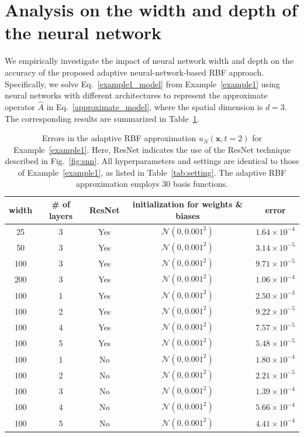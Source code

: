 \section{Analysis on the width and depth of the neural network}
\label{example1_appendix}
We empirically investigate the impact of neural network width and depth on the accuracy of the proposed adaptive neural-network-based RBF approach. Specifically, we solve Eq.~\eqref{example1_model} from Example~\ref{example1} using neural networks with different architectures to represent the approximate operator $\hat{A}$ in Eq.~\eqref{approximate_model}, where the spatial dimension is $d=3$. The corresponding results are summarized in Table~\ref{tab:nn_structure}.
\begin{table}[h!]
\scriptsize
\centering
  \caption{Errors in the adaptive RBF approximation $u_N(\bm{x}, t=2)$ for Example~\ref{example1}. Here, ResNet indicates the use of the ResNet technique described in Fig.~\ref{fig:snn}. All hyperparameters and settings are identical to those of Example~\ref{example1}, as listed in Table~\ref{tab:setting}. The adaptive RBF approximation employs 30 basis functions.}
\begin{tabular}{ccccc}
\toprule  width & \# of layers & ResNet & initialization for weights \& biases & error   \\ 
\midrule 
25 & 3 & Yes & $\mathcal{N}(0, 0.001^2)$& $1.64\times10^{-4}$ \\ 
50 & 3 & Yes & $\mathcal{N}(0, 0.001^2)$& $3.14\times10^{-5}$  \\ 
 100 & 3 & Yes & $\mathcal{N}(0, 0.001^2)$ & $9.71\times10^{-5}$  \\
  200 & 3 & Yes & $\mathcal{N}(0, 0.001^2)$ & $1.06\times10^{-4}$  \\
    100 & 1 & Yes & $\mathcal{N}(0, 0.001^2)$&  $2.50\times10^{-3}$
 \\ 
  100 & 2 & Yes & $\mathcal{N}(0, 0.001^2)$& $9.22\times10^{-5}$
  \\ 
100 & 4 & Yes & $\mathcal{N}(0, 0.001^2)$& $7.57\times10^{-5}$  \\ 
100 & 5 & Yes & $\mathcal{N}(0, 0.001^2)$& $5.48\times10^{-5}$  \\ 
   100 & 1 & No & $\mathcal{N}(0, 0.001^2)$& $1.80\times10^{-4}$  \\ 
100 & 2 & No & $\mathcal{N}(0, 0.001^2)$& $2.21\times10^{-5}$  \\ 
100 & 3 & No & $\mathcal{N}(0, 0.001^2)$& $1.39\times10^{-4}$ \\ 
100 & 4 & No & $\mathcal{N}(0, 0.001^2)$& $5.66\times10^{-4}$ \\ 
100 & 5 & No & $\mathcal{N}(0, 0.001^2)$& $4.41\times10^{-4}$ \\ 
\bottomrule
\end{tabular}
\label{tab:nn_structure}
\end{table}



